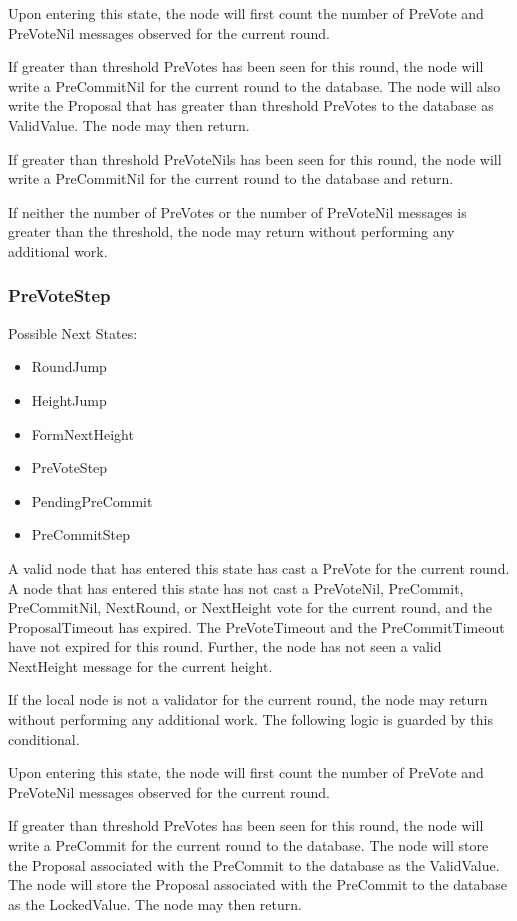 Upon entering this state, the node will first count the number of
PreVote and PreVoteNil messages observed for the current round.

If greater than threshold PreVotes has been seen for this round, the
node will write a PreCommitNil for the current round to the database.
The node will also write the Proposal that has greater than threshold
PreVotes to the database as ValidValue.
The node may then return.

If greater than threshold PreVoteNils has been seen for this round, the
node will write a PreCommitNil for the current round to the database
and return.

If neither the number of PreVotes or the number of PreVoteNil messages
is greater than the threshold, the node may return without performing
any additional work.


\subsubsection{PreVoteStep}

Possible Next States:

\begin{itemize}
    \item RoundJump
    \item HeightJump
    \item FormNextHeight
    \item PreVoteStep
    \item PendingPreCommit
    \item PreCommitStep
\end{itemize}

A valid node that has entered this state has cast a PreVote for the
current round.
A node that has entered this state has not cast a PreVoteNil,
PreCommit, PreCommitNil, NextRound, or NextHeight vote for the current
round, and the ProposalTimeout has expired.
The PreVoteTimeout and the PreCommitTimeout have not expired for this
round.
Further, the node has not seen a valid NextHeight message for the
current height.

If the local node is not a validator for the current round, the node
may return without performing any additional work.
The following logic is guarded by this conditional.

Upon entering this state, the node will first count the number of
PreVote and PreVoteNil messages observed for the current round.

If greater than threshold PreVotes has been seen for this round, the
node will write a PreCommit for the current round to the database.
The node will store the Proposal associated with the PreCommit to the
database as the ValidValue.
The node will store the Proposal associated with the PreCommit to the
database as the LockedValue.
The node may then return.

